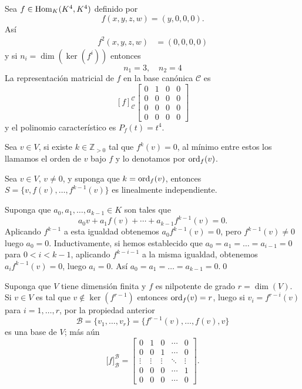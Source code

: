 \begin{ejem}\label{ejnil4}
Sea $f\in\operatorname{Hom}_K(K^4,K^4)$ definido por
$$f(x,y,z,w)=(y,0,0,0).$$
As\'i
\begin{align*}
f^2(x,y,z,w) & = (0,0,0,0)
\end{align*}
y si $n_i=\dim(\ker(f^i))$ entonces
$$n_1=3,\quad n_2=4$$
La representaci\'on matricial de $f$ en la base can\'onica $\mathcal{C}$ es
$$
\left[f\right]^{\mathcal{C}}_{\mathcal{C}}\left[\begin{array}{rr|r|r}
0 & 1 & 0 & 0\\
0 & 0 & 0 & 0\\
\hline
0 & 0 & 0 & 0\\
\hline
0 & 0 & 0 & 0
\end{array}\right]
$$
y el polinomio caracter\'istico es $P_f(t)=t^4$.
\end{ejem}

\begin{defn}
Sea $v\in V$, si existe $k\in\mathbb{Z}_{>0}$ tal que $f^k(v)=0$, al m\'inimo entre estos los llamamos el orden de $v$ bajo $f$ y lo denotamos por $\operatorname{ord}_f(v)$.
\end{defn}

\begin{pro}
Sea $v\in V$, $v\ne 0$, y suponga que $k=\operatorname{ord}_f(v)$, entonces $S=\{v,f(v),\ldots,f^{k-1}(v)\}$ es linealmente independiente.
\end{pro}

\dem Suponga que $a_0,a_1,\ldots,a_{k-1}\in K$ son tales que
\[
a_0v+a_1f(v)+\cdots+a_{k-1}f^{{k-1}}(v)=0.
\]
Aplicando $f^{k-1}$ a esta igualdad obtenemos $a_0f^{k-1}(v)=0$, pero $f^{k-1}(v)\ne 0$ luego $a_0=0$. Inductivamente, si hemos establecido que $a_0=a_1=\ldots=a_{i-1}=0$ para $0<i<k-1$, aplicando $f^{k-i-1}$ a la misma igualdad, obtenemos $a_if^{k-1}(v)=0$, luego $a_i=0$. As\'i $a_0=a_1=\ldots=a_{k-1}=0$.\qed

\begin{obs}\label{obsformajordannil}
Suponga que $V$ tiene dimensi\'on finita y $f$ es nilpotente de grado $r=\dim(V)$. Si $v\in V$ es tal que $v\not\in\ker(f^{r-1})$ entonces $\operatorname{ord}_f(v)=r$, luego si $v_i=f^{r-i}(v)$ para $i=1,\ldots,r$, por la propiedad anterior
\[
\mathcal{B}=\{v_1,\ldots,v_r\}=\{f^{r-1}(v),\ldots,f(v),v\}
\]
es una base de $V$; m\'as a\'un
\[
\Big[f\Big]^{\mathcal{B}}_{\mathcal{B}}=\left[\begin{array}{ccccc}
0 & 1 & 0 &\cdots & 0\\
0 & 0 & 1 &\cdots & 0\\
\vdots & \vdots & \vdots &\ddots & \vdots\\
0 & 0 & 0 & \cdots & 1\\
0 & 0 & 0 & \cdots & 0
\end{array}\right].
\]
\end{obs}

